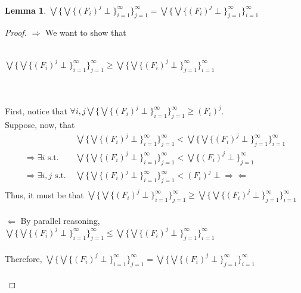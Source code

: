 \documentclass{westhesis}
\theoremstyle{plain}
\newtheorem{lemma}[thm]{Lemma}
\theoremstyle{definition}
\begin{document}
 \begin{lemma} $\bigvee\{\bigvee\{(F_i)^j \perp\}^{\infty}_{i=1}\}^{\infty}_{j=1}= \bigvee\{\bigvee\{(F_i)^j \perp\}^{\infty}
 _{j=1}\}^{\infty}_{i=1}$\\
 \end{lemma}
 \begin{proof}
 $\Rightarrow$ We want to show that\\ \\ \centerline{$\bigvee\{\bigvee\{(F_i)^j \perp\}^{\infty}_{i=1}\}^{\infty}
 _{j=1} \geq  \bigvee\{\bigvee\{(F_i)^j \perp\}^{\infty}_{j=1}\}^{\infty}_{i=1}$} \\ \\ First, notice that $\forall i, j \bigvee\{\bigvee
 \{(F_i)^j \perp\}^{\infty}_{i=1}\}^{\infty}_{j=1} \geq (F_i)^j$. \\
 Suppose, now, that 
 \begin{align*}
 &\bigvee\{\bigvee\{(F_i)^j \perp\}^{\infty}_{i=1}\}^{\infty}_{j=1} < \bigvee\{\bigvee\{(F_i)^j \perp\}^{\infty}_{j=1}\}^{\infty}_{i=1}\\ 
 \Rightarrow \exists i \text{ s.t. \ \  \ } &\bigvee\{\bigvee\{(F_i)^j \perp\}^{\infty}_{i=1}\}^{\infty}_{j=1} < \bigvee\{(F_i)^j \perp\}
 ^{\infty}_{j=1}\\
 \Rightarrow \exists i, j \text{ s.t. } &\bigvee\{\bigvee\{(F_i)^j \perp\}^{\infty}_{i=1}\}^{\infty}_{j=1} < (F_i)^j \perp 
 \Rightarrow\Leftarrow\\
 \end{align*}
 Thus, it must be that $\bigvee\{\bigvee\{(F_i)^j \perp\}^{\infty}_{i=1}\}^{\infty}_{j=1} \geq  \bigvee\{\bigvee\{(F_i)^j \perp\}^{\infty}
 _{j=1}\}^{\infty}_{i=1}$ \\ \\
 $\Leftarrow$ By parallel reasoning, $\bigvee\{\bigvee\{(F_i)^j \perp\}^{\infty}_{i=1}\}^{\infty}_{j=1} \leq  \bigvee\{\bigvee\{(F_i)^j 
 \perp\}^{\infty}_{j=1}\}^{\infty}_{i=1}$ \\ \\
 Therefore, $\bigvee\{\bigvee\{(F_i)^j \perp\}^{\infty}_{i=1}\}^{\infty}_{j=1} = \bigvee\{\bigvee\{(F_i)^j \perp\}^{\infty}_{j=1}\}
 ^{\infty}_{i=1}$ \\ \\
 \end{proof}
\end{document}
